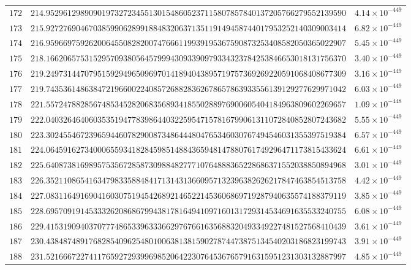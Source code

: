 \documentclass[12pt,reqno]{amsart}
\theoremstyle{remark}
\begin{document}
\begin{longtable}{clc}
$172$ & $214.9529612989090197327234551301548605237115807857840137205766279552139590$ & $4.14\times 10^{-449}$ \\
$173$ & $215.9272769046703859906289918848320637135119149458744017953252140309003414$ & $6.82\times 10^{-449}$ \\
$174$ & $216.9596697592620064550828200747666119939195367590873253408582050365022907$ & $5.45\times 10^{-449}$ \\
$175$ & $218.1662065753152957093805645799943093390979334323784253846653018131756370$ & $3.40\times 10^{-449}$ \\
$176$ & $219.2497314470795159294965096970141894043895719757369269220591068408677309$ & $3.16\times 10^{-449}$ \\
$177$ & $219.7435361486384721966002240857268828362678657863933556139129277629971042$ & $6.03\times 10^{-449}$ \\
$178$ & $221.5572478828567485345282068356893418550288976900605404184963809602269657$ & $1.09\times 10^{-448}$ \\
$179$ & $222.0403264640603535194778398644032259547157816799061311072840852807243682$ & $5.55\times 10^{-449}$ \\
$180$ & $223.3024554672396594460782900873486444804765346030767494546031355397519384$ & $6.57\times 10^{-449}$ \\
$181$ & $224.0645916273400065593418284598514884365948147880761749296471173815433624$ & $6.61\times 10^{-449}$ \\
$182$ & $225.6408738169895753567285873098848277710764888365228686371552038850894968$ & $3.01\times 10^{-449}$ \\
$183$ & $226.3521108654163479833588484171314313660957132396382626217847463854513758$ & $4.42\times 10^{-449}$ \\
$184$ & $227.0831164916904160307519454268921465221453606869719287940635574188379119$ & $3.85\times 10^{-449}$ \\
$185$ & $228.6957091914533326208686799438178164941097160131729314534691635533240755$ & $6.08\times 10^{-449}$ \\
$186$ & $229.4153190940370777486533963336629767661635688320493349227481527568410439$ & $3.61\times 10^{-449}$ \\
$187$ & $230.4384874891768285409625480100638138159027874473875134540203186823199743$ & $3.91\times 10^{-449}$ \\
$188$ & $231.5216667227411765927293996985206422307645367657916315951231303132887997$ & $4.85\times 10^{-449}$ \\

\end{longtable}
\end{document}
